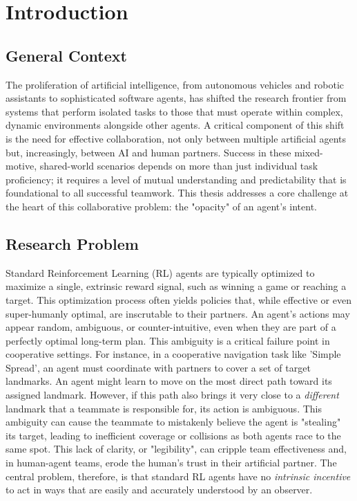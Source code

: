 \documentclass[12pt, a4paper]{report}
\begin{document}
\chapter{Introduction}

\section{General Context}
The proliferation of artificial intelligence, from autonomous vehicles and robotic assistants to sophisticated software agents, has shifted the research frontier from systems that perform isolated tasks to those that must operate within complex, dynamic environments alongside other agents. A critical component of this shift is the need for effective collaboration, not only between multiple artificial agents but, increasingly, between AI and human partners. Success in these mixed-motive, shared-world scenarios depends on more than just individual task proficiency; it requires a level of mutual understanding and predictability that is foundational to all successful teamwork. This thesis addresses a core challenge at the heart of this collaborative problem: the "opacity" of an agent's intent.

\section{Research Problem}
Standard Reinforcement Learning (RL) agents are typically optimized to maximize a single, extrinsic reward signal, such as winning a game or reaching a target. This optimization process often yields policies that, while effective or even super-humanly optimal, are inscrutable to their partners. An agent's actions may appear random, ambiguous, or counter-intuitive, even when they are part of a perfectly optimal long-term plan. This ambiguity is a critical failure point in cooperative settings. For instance, in a cooperative navigation task like 'Simple Spread', an agent must coordinate with partners to cover a set of target landmarks. An agent might learn to move on the most direct path toward its assigned landmark. However, if this path also brings it very close to a \textit{different} landmark that a teammate is responsible for, its action is ambiguous. This ambiguity can cause the teammate to mistakenly believe the agent is "stealing" its target, leading to inefficient coverage or collisions as both agents race to the same spot. This lack of clarity, or "legibility", can cripple team effectiveness and, in human-agent teams, erode the human's trust in their artificial partner. The central problem, therefore, is that standard RL agents have no \textit{intrinsic incentive} to act in ways that are easily and accurately understood by an observer.
\end{document}

